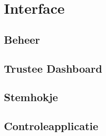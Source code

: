 % 
%

\chapter{Interface}
\label{chap:interface}

\section{Beheer}

\section{Trustee Dashboard}

\section{Stemhokje}

\section{Controleapplicatie}
